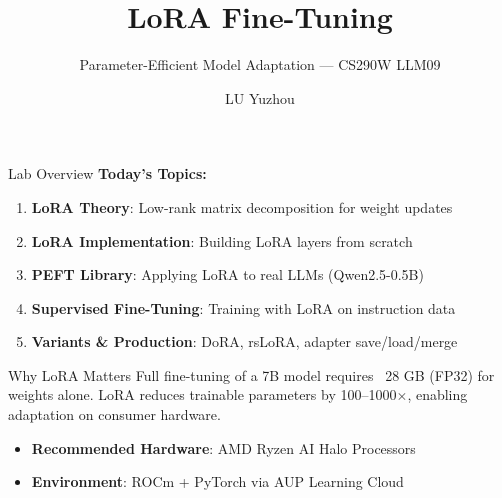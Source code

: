 \documentclass[aspectratio=169,10pt]{beamer}
\title{LoRA Fine-Tuning}
\subtitle{Parameter-Efficient Model Adaptation --- CS290W LLM09}
\author{LU Yuzhou}
\date{}
\begin{document}
\frame{\titlepage}

\begin{frame}{Lab Overview}
	\textbf{Today's Topics:}
	\begin{enumerate}
		\item \textbf{LoRA Theory}: Low-rank matrix decomposition for weight updates
		\item \textbf{LoRA Implementation}: Building LoRA layers from scratch
		\item \textbf{PEFT Library}: Applying LoRA to real LLMs (Qwen2.5-0.5B)
		\item \textbf{Supervised Fine-Tuning}: Training with LoRA on instruction data
		\item \textbf{Variants \& Production}: DoRA, rsLoRA, adapter save/load/merge
	\end{enumerate}

	\vspace{0.3cm}
	\begin{block}{Why LoRA Matters}
		Full fine-tuning of a 7B model requires ~28 GB (FP32) for weights alone. LoRA reduces trainable parameters by 100--1000$\times$, enabling adaptation on consumer hardware.
	\end{block}

	\vspace{0.2cm}
	\begin{itemize}
		\item \textbf{Recommended Hardware}: AMD Ryzen AI Halo Processors
		\item \textbf{Environment}: ROCm + PyTorch via AUP Learning Cloud
	\end{itemize}
\end{frame}
\end{document}
